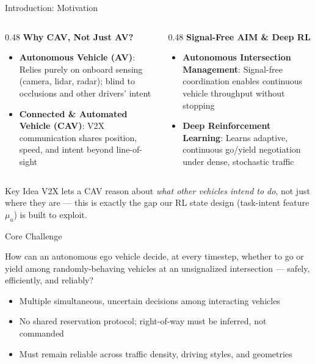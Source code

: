 \documentclass[aspectratio=169,10pt]{beamer}
\begin{document}
\begin{frame}{Introduction: Motivation}
    \begin{columns}[T]
        \begin{column}{0.48\textwidth}
            \textbf{Why CAV, Not Just AV?}
            \begin{itemize}
                \item \textbf{Autonomous Vehicle (AV)}: Relies purely on onboard sensing (camera, lidar, radar); blind to occlusions and other drivers' intent
                \item \textbf{Connected \& Automated Vehicle (CAV)}: V2X communication shares position, speed, and \alert{intent} beyond line-of-sight
            \end{itemize}
        \end{column}
        \begin{column}{0.48\textwidth}
            \textbf{Signal-Free AIM \& Deep RL}
            \begin{itemize}
                \item \textbf{Autonomous Intersection Management}: Signal-free coordination enables continuous vehicle throughput without stopping
                \item \textbf{Deep Reinforcement Learning}: Learns adaptive, continuous go/yield negotiation under dense, stochastic traffic
            \end{itemize}
        \end{column}
    \end{columns}
    \vspace{8pt}
    \begin{alertblock}{Key Idea}
        V2X lets a CAV reason about \emph{what other vehicles intend to do}, not just where they are — this is exactly the gap our RL state design (task-intent feature $\mu_a$) is built to exploit.
    \end{alertblock}
\end{frame}


\begin{frame}{Core Challenge}
    \begin{center}
        \Large How can an autonomous ego vehicle decide, at every timestep, whether to \alert{go} or \alert{yield} among randomly-behaving vehicles at an unsignalized intersection --- safely, efficiently, and reliably?
    \end{center}
    \vspace{10pt}
    \begin{itemize}
        \item Multiple simultaneous, uncertain decisions among interacting vehicles
        \item No shared reservation protocol; right-of-way must be inferred, not commanded
        \item Must remain reliable across traffic density, driving styles, and geometries
    \end{itemize}
\end{frame}
\end{document}
